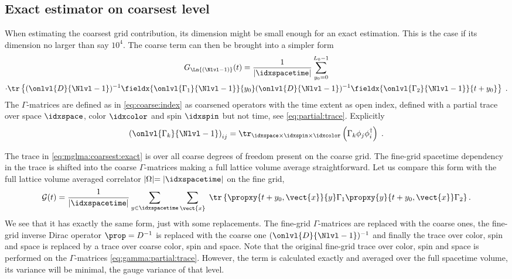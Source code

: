 \subsection{Exact estimator on coarsest level}
\label{sec:mglma:coarsest:exact}

When estimating the coarsest grid contribution, its dimension might be small enough for an exact estimation.
This is the case if its dimension no larger than say $10^{4}$.
The coarse term can then be brought into a simpler form
\begin{multline} \label{eq:mglma:coarsest:exact}
G_{\Ln{(\Nlvl-1)}}(t)
= \frac{1}{\lvert \idxspacetime \rvert} \sum_{y_0=0}^{L_0-1} \\
\cdot \tr \left\{
	(\onlvl{D}{\Nlvl-1})^{-1}
	\fieldx{\onlvl{\Gamma_1}{\Nlvl-1}}{y_0}
	(\onlvl{D}{\Nlvl-1})^{-1}
	\fieldx{\onlvl{\Gamma_2}{\Nlvl-1}}{t+y_0}
\right\} \;.
\end{multline}
The $\Gamma$-matrices are defined as in \cref{eq:coarse:index} as coarsened operators with the time extent as open index, \ie defined with a partial trace over space $\idxspace$, color $\idxcolor$ and spin $\idxspin$ but not time, see \cref{eq:partial:trace}.
Explicitly
\begin{equation} \label{eq:gamma:partial:trace}
\left( \onlvl{\Gamma_k}{\Nlvl-1} \right)_{ij} = \tr_{\idxspace \times \idxspin \times \idxcolor} \left( \Gamma_k \phi_j \phi_i^\dagger \right) \;.
\end{equation}

The trace in \cref{eq:mglma:coarsest:exact} is over all coarse degrees of freedom present on the coarse grid.
The fine-grid spacetime dependency in the trace is shifted into the coarse $\Gamma$-matrices making a full lattice volume average straightforward.
Let us compare this form with the full lattice volume averaged correlator $\lvert \Omega \lvert = \lvert \idxspacetime \lvert$ on the fine grid,
\begin{equation} \label{eq:G:corr:volume:averaged}
\mathcal{G}(t) =
\frac{1}{\lvert \idxspacetime \rvert}
\sum_{y \in \idxspacetime}
\sum_{\vect{x}} \;
\tr \left\{
  \propxy{t+y_0, \vect{x}}{y} \Gamma_1 \propxy{y}{t+y_0, \vect{x}} \Gamma_2
\right\}.
\end{equation}
We see that it has exactly the same form, just with some replacements.
The fine-grid $\Gamma$-matrices are replaced with the coarse ones, the fine-grid inverse Dirac operator $\prop=D^{-1}$ is replaced with the coarse one $(\onlvl{D}{\Nlvl-1})^{-1}$ and finally the trace over color, spin and space is replaced by a trace over coarse color, spin and space.
Note that the original fine-grid trace over color, spin and space is performed on the $\Gamma$-matrices \cref{eq:gamma:partial:trace}.
However, the term is calculated exactly and averaged over the full spacetime volume, its variance will be minimal, \ie the gauge variance of that level.

